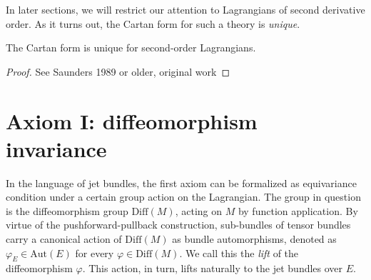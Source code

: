 In later sections, we will restrict our attention to Lagrangians of second derivative order. As it turns out, the Cartan form for such a theory is \emph{unique}.
\begin{proposition}
  The Cartan form is unique for second-order Lagrangians.
\end{proposition}
\begin{proof}
  See Saunders 1989 or older, original work
\end{proof}

\section{Axiom I: diffeomorphism invariance}

In the language of jet bundles, the first axiom can be formalized as equivariance condition under a certain group action on the Lagrangian. The group in question is the diffeomorphism group $\mathrm{Diff}(M)$, acting on $M$ by function application. By virtue of the pushforward-pullback construction, sub-bundles of tensor bundles carry a canonical action of $\mathrm{Diff}(M)$ as bundle automorphisms, denoted as $\varphi_E\in \mathrm{Aut}(E)$ for every $\varphi\in\mathrm{Diff}(M)$. We call this the \emph{lift} of the diffeomorphism $\varphi$. This action, in turn, lifts naturally to the jet bundles over $E$.

